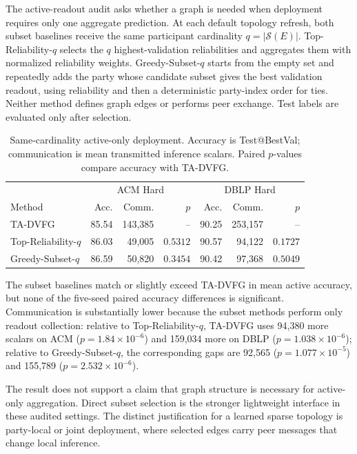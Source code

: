\documentclass[letterpaper]{article}
\newcommand{\method}{\textsc{TA-DVFG}}
\begin{document}
The active-readout audit asks whether a graph is needed when deployment requires
only one aggregate prediction. At each default topology refresh, both subset
baselines receive the same participant cardinality
$q=|\mathcal{S}(E)|$. Top-Reliability-$q$ selects the $q$ highest-validation
reliabilities and aggregates them with normalized reliability weights.
Greedy-Subset-$q$ starts from the empty set and repeatedly adds the party whose
candidate subset gives the best validation readout, using reliability and then a
deterministic party-index order for ties. Neither method defines graph edges or
performs peer exchange. Test labels are evaluated only after selection.

\begin{table}[!t]
\centering
\scriptsize
\setlength{\tabcolsep}{3.2pt}
\caption{Same-cardinality active-only deployment. Accuracy is Test@BestVal;
communication is mean transmitted inference scalars. Paired $p$-values compare
accuracy with \method{}.}
\label{tab:supp-subset-baselines}
\begin{tabular}{lrrrrrr}
\toprule
& \multicolumn{3}{c}{ACM Hard} & \multicolumn{3}{c}{DBLP Hard} \\
Method & Acc. & Comm. & $p$ & Acc. & Comm. & $p$ \\
\midrule
\method{} & 85.54 & 143,385 & -- & 90.25 & 253,157 & -- \\
Top-Reliability-$q$ & 86.03 & 49,005 & $0.5312$ & 90.57 & 94,122 & $0.1727$ \\
Greedy-Subset-$q$ & 86.59 & 50,820 & $0.3454$ & 90.42 & 97,368 & $0.5049$ \\
\bottomrule
\end{tabular}
\end{table}

The subset baselines match or slightly exceed \method{} in mean active accuracy,
but none of the five-seed paired accuracy differences is significant.
Communication is substantially lower because the subset methods perform only
readout collection: relative to Top-Reliability-$q$, \method{} uses 94,380 more
scalars on ACM ($p=1.84\times10^{-6}$) and 159,034 more on DBLP
($p=1.038\times10^{-6}$); relative to Greedy-Subset-$q$, the corresponding
gaps are 92,565 ($p=1.077\times10^{-5}$) and 155,789
($p=2.532\times10^{-6}$).

The result does not support a claim that graph structure is necessary for
active-only aggregation. Direct subset selection is the stronger lightweight
interface in these audited settings. The distinct justification for a learned
sparse topology is party-local or joint deployment, where selected edges carry
peer messages that change local inference.
\end{document}

